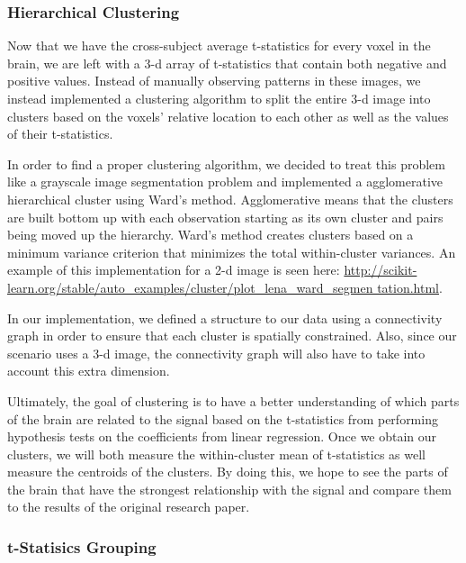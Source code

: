 \subsubsection{Hierarchical Clustering}

\par Now that we have the cross-subject average t-statistics for every voxel 
in the brain, we are left with a 3-d array of t-statistics that contain both 
negative and positive values. Instead of manually observing patterns in these 
images, we instead implemented a clustering algorithm to split the entire 3-d 
image into clusters based on the voxels' relative location to each other as 
well as the values of their t-statistics.

\par In order to find a proper clustering algorithm, we decided to treat this
problem like a grayscale image segmentation problem and implemented a
agglomerative hierarchical cluster using Ward's method. Agglomerative means
that the clusters are built bottom up with each observation starting as its
own cluster and pairs being moved up the hierarchy. Ward's method creates
clusters based on a minimum variance criterion that minimizes the total
within-cluster variances. An example of this implementation for a 2-d image is
seen here: 
\url{http://scikit-learn.org/stable/auto_examples/cluster/plot_lena_ward_segmen
tation.html}.

In our implementation, we defined a structure to our data using a connectivity
graph in order to ensure that each cluster is spatially constrained. Also,
since our scenario uses a 3-d image, the connectivity graph will also have to
take into account this extra dimension.


\par Ultimately, the goal of clustering is to have a better understanding of 
which parts of the brain are related to the signal based on the t-statistics 
from performing hypothesis tests on the coefficients from linear regression.
Once we obtain our clusters, we will both measure the within-cluster mean of
t-statistics as well measure the centroids of the clusters. By doing this, we 
hope to see the parts of the brain that have the strongest relationship with 
the signal and compare them to the results of the original research paper.

\subsubsection{t-Statisics Grouping}

